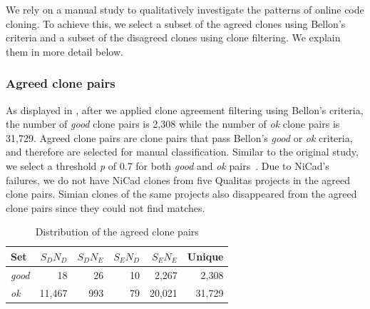 \documentclass[sigconf,review, anonymous]{acmart}
\begin{document}
We rely on a manual study to qualitatively investigate the patterns of online code cloning. To achieve this, we select a subset of the agreed clones using Bellon's criteria and a subset of the disagreed clones using clone filtering. We explain them in more detail below.

\subsubsection{Agreed clone pairs}

As displayed in , after we applied clone agreement filtering using Bellon's criteria, the number of \textit{good} clone pairs is 2,308 while the number of \textit{ok} clone pairs is 31,729. %
Agreed clone pairs are clone pairs that pass Bellon's \textit{good} or \textit{ok} criteria, and therefore are selected for manual classification. Similar to the original study, we select a threshold \textit{p} of 0.7 for both \textit{good} and \textit{ok} pairs~\cite{Bellon2007}. %
Due to NiCad's failures, we do not have NiCad clones from five Qualitas projects in the agreed clone pairs. Simian clones of the same projects also disappeared from the agreed clone pairs since they could not find matches.

\begin{table}
	\centering
	\caption{Distribution of the agreed clone pairs}
	\label{t_agreed_good_clone_pairs}
	\small
	\begin{tabular}{l|r|r|r|r|r}
		\hline
		Set & $S_DN_D$ & $S_DN_E$ & $S_EN_D$ & $S_EN_E$ & Unique \\
		\hline
		\textit{good} & 18 & 26 & 10 & 2,267 & 2,308 \\
		\textit{ok} & 11,467 & 993 & 79 & 20,021 & 31,729  \\
		\hline
	\end{tabular} %
\end{table}
\end{document}
